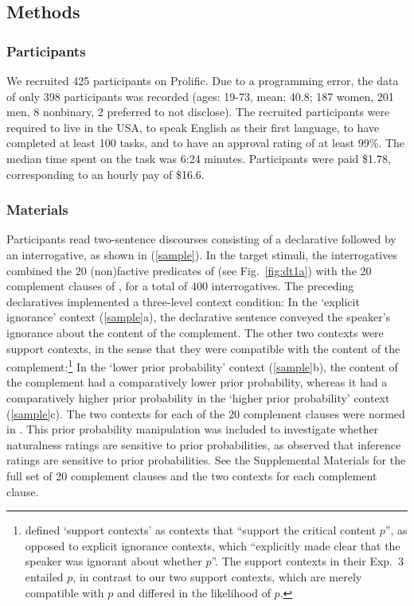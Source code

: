 \documentclass[11pt,fleqn]{article}
\newcommand{\6}{\mbox{$[\hspace*{-.6mm}[$}}
\newcommand{\9}{\mbox{$]\hspace*{-.6mm}]$}}
\begin{document}
\subsection{Methods}\label{s-methods}

\subsubsection{Participants}

We recruited 425 participants on Prolific. Due to a programming error, the data of only 398 participants was recorded (ages: 19-73, mean: 40.8; 187 women, 201 men, 8 nonbinary, 2 preferred to not disclose). The recruited participants were required to live in the USA, to speak English as their first language, to have completed at least 100 tasks, and to have an approval rating of at least 99\%. The median time spent on the task was 6:24 minutes. Participants were paid \$1.78, corresponding to an hourly pay of \$16.6.


\subsubsection{Materials}

Participants read two-sentence discourses consisting of a declarative followed by an interrogative, as shown in (\ref{sample}). In the target stimuli, the interrogatives combined the 20 (non)factive predicates of \citealt{degen-tonhauser-language} (see Fig.~\ref{fig:dt1a}) with the 20 complement clauses of \citealt{degen-tonhauser-language}, for a total of 400 interrogatives. The preceding declaratives implemented a three-level context condition: In the `explicit ignorance' context (\ref{sample}a), the declarative sentence conveyed the speaker's ignorance about the content of the complement. The other two contexts were support contexts, in the sense that they were compatible with the content of the complement:\footnote{\label{fn:contexts}\citealt[490]{mandelkern-etal2020} defined `support contexts' as contexts that ``support the critical content $p$'', as opposed to explicit ignorance contexts, which ``explicitly made clear that the speaker was ignorant about whether $p$''. The support contexts in their Exp.~3 entailed $p$, in contrast to our two support contexts, which are merely compatible with $p$ and differed in the likelihood of $p$.} In the `lower prior probability' context (\ref{sample}b), the content of the complement had a comparatively lower prior probability, whereas it had a comparatively higher prior probability in the `higher prior probability' context (\ref{sample}c). The two contexts for each of the 20 complement clauses were normed in \citealt{degen-tonhauser-openmind}. This prior probability manipulation was included to investigate whether naturalness ratings are sensitive to prior probabilities, as \citealt{degen-tonhauser-openmind} observed that inference ratings are sensitive to prior probabilities. See the Supplemental Materials for the full set of 20 complement clauses and the two contexts for each complement clause.
\end{document}
